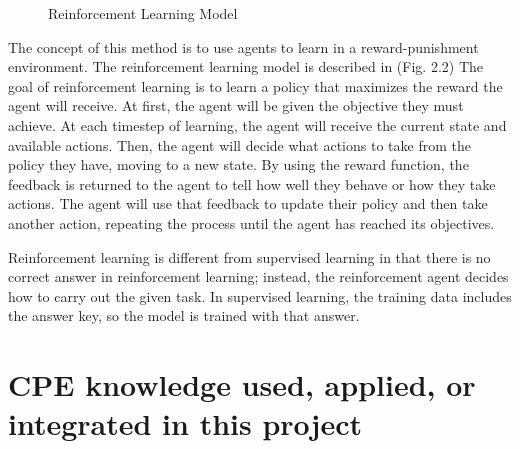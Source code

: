 \begin{figure}
  \centering
  
  \caption{Reinforcement Learning Model}
  \label{fig:rl-flow}
\end{figure}

The concept of this method is to use agents to learn in a reward-punishment environment. The reinforcement learning model is described in (Fig. 2.2) The goal of reinforcement learning is to learn a policy that maximizes the reward the agent will receive. At first, the agent will be given the objective they must achieve. At each timestep of learning, the agent will receive the current state and available actions. Then, the agent will decide what actions to take from the policy they have, moving to a new state. By using the reward function, the feedback is returned to the agent to tell how well they behave or how they take actions. The agent will use that feedback to update their policy and then take another action, repeating the process until the agent has reached its objectives.

Reinforcement learning is different from supervised learning in that there is no correct answer in reinforcement learning; instead, the reinforcement agent decides how to carry out the given task. In supervised learning, the training data includes the answer key, so the model is trained with that answer.
 
\section{CPE knowledge used, applied, or integrated in this project} %




